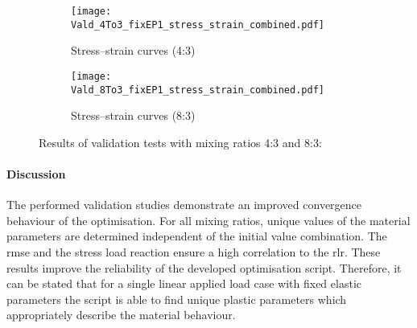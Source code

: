 
\begin{figure}[H]
\centering

\begin{subfigure}[t]{0.495\textwidth}
    \centering
    \texttt{[image: Vald\_4To3\_fixEP1\_stress\_strain\_combined.pdf]}
    \caption{Stress–strain curves (4:3)}
    \label{fig:validStressStrain4to3}
\end{subfigure}
\hfill
\begin{subfigure}[t]{0.495\textwidth}
    \centering
    \texttt{[image: Vald\_8To3\_fixEP1\_stress\_strain\_combined.pdf]}
    \caption{Stress–strain curves (8:3)}
    \label{fig:validStressStrain8to3}
\end{subfigure}
\caption{Results of validation tests with mixing ratios 4:3 and 8:3:}
\label{fig:validStressStrain4and8}
\end{figure}


\paragraph{Discussion}
The performed validation studies demonstrate an improved convergence behaviour of the optimisation. For all mixing ratios, unique values of the material parameters are determined independent of the initial value combination. The \acrshort{rmse} and the stress load reaction ensure a high correlation to the \acrlong{rlr}. These results improve the reliability of the developed optimisation script. Therefore, it can be stated that for a single linear applied load case with fixed elastic parameters the script is able to find unique plastic parameters which appropriately describe the material behaviour.


